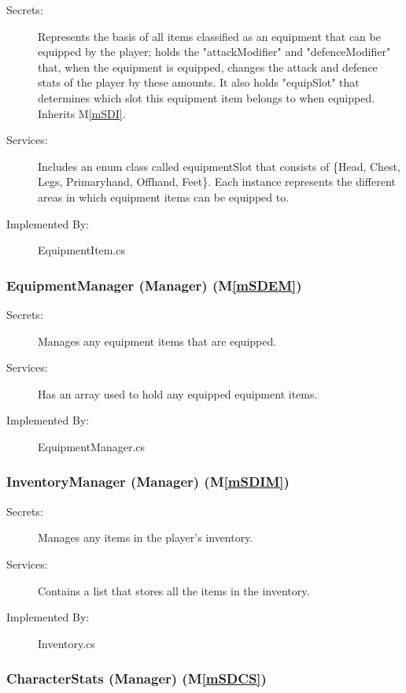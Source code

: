 \documentclass[12pt, titlepage]{article}
\newcommand{\mref}[1]{M\ref{#1}}
\begin{document}
\begin{description}
\item[Secrets:] Represents the basis of all items classified as an equipment that can be equipped by the player; holds the "attackModifier" and "defenceModifier" that, when the equipment is equipped, changes the attack and defence stats of the player by these amounts. It also holds "equipSlot" that determines which slot this equipment item belongs to when equipped. Inherits \mref{mSDI}.
\item[Services:] Includes an enum class called equipmentSlot that consists of \{Head, Chest, Legs, Primaryhand, Offhand, Feet\}. Each instance represents the different areas in which equipment items can be equipped to.
\item[Implemented By:] EquipmentItem.cs
\end{description}

\subsubsection{EquipmentManager (Manager) (\mref{mSDEM})}

\begin{description}
\item[Secrets:] Manages any equipment items that are equipped. 
\item[Services:] Has an array used to hold any equipped equipment items.
\item[Implemented By:] EquipmentManager.cs
\end{description}

\subsubsection{InventoryManager (Manager) (\mref{mSDIM})}

\begin{description}
\item[Secrets:] Manages any items in the player's inventory.
\item[Services:] Contains a list that stores all the items in the inventory.
\item[Implemented By:] Inventory.cs
\end{description}

\subsubsection{CharacterStats (Manager) (\mref{mSDCS})}
\end{document}
